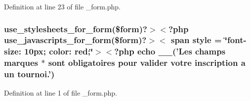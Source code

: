 Definition at line 23 of file \-\_\-form.\-php.

\hypertarget{live_2modules_2user_2templates_2__form_8php_a86bc4522fdbe625b07bc4a4d6eec3df7}{
\subsubsection[{use\-\_\-stylesheets\-\_\-for\-\_\-form}]{\setlength{\rightskip}{0pt plus 5cm}use\-\_\-stylesheets\-\_\-for\-\_\-form(\$form)?$>$$<$?php use\-\_\-javascripts\-\_\-for\-\_\-form(\$form)?$>$$<$ span {\bf style} = \char`\"{}font-\/size\-: 10px; color\-: red;\char`\"{}$>$$<$?php echo \-\_\-\-\_\-('\-Les champs marques $\ast$ sont obligatoires pour valider votre inscription a un tournoi.')}}\label{live_2modules_2user_2templates_2__form_8php_a86bc4522fdbe625b07bc4a4d6eec3df7}


Definition at line 1 of file \-\_\-form.\-php.

